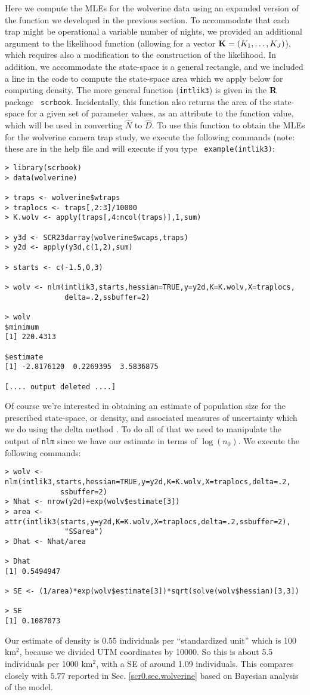Here we compute the MLEs for the wolverine data using an expanded
version of the function we developed in the previous section. To
accommodate that each trap might be operational a variable number of
nights, we provided an additional argument to the likelihood function
(allowing for a vector ${\bf K}= (K_{1},\ldots,K_{J})$), which
requires also a modification to the construction of the likelihood.
In addition, we accommodate the state-space is a general rectangle,
and we included a line in the code to compute the state-space area
which we apply below for computing density.  The more general function
(\mbox{\tt intlik3}) is given in the {\bf R} package \mbox{\tt
  scrbook}.  Incidentally, this function also returns the area of the
state-space for a given set of parameter values, as an attribute to
the function value, which will be used in converting $\hat{N}$ to
$\hat{D}$.  To use this function to obtain the MLEs for the wolverine
camera trap study, we execute the following commands (note: these are
in the help file and will execute if you type \mbox{\tt
  example(intlik3)}: 
{\small
\begin{verbatim}
> library(scrbook)
> data(wolverine)
 
> traps <- wolverine$wtraps
> traplocs <- traps[,2:3]/10000
> K.wolv <- apply(traps[,4:ncol(traps)],1,sum)

> y3d <- SCR23darray(wolverine$wcaps,traps)
> y2d <- apply(y3d,c(1,2),sum)

> starts <- c(-1.5,0,3)

> wolv <- nlm(intlik3,starts,hessian=TRUE,y=y2d,K=K.wolv,X=traplocs,
              delta=.2,ssbuffer=2)

> wolv
$minimum
[1] 220.4313

$estimate
[1] -2.8176120  0.2269395  3.5836875

[.... output deleted ....]
\end{verbatim}
} Of course we're interested in obtaining an estimate of population
size for the prescribed state-space, or density, and associated
measures of uncertainty which we do using the delta method
\citep[][Appendix F4]{williams_etal:2002}.  To do all of that we need
to manipulate the output of \mbox{\tt nlm} since we have our estimate
in terms of $\log(n_{0})$. We execute the following commands: 
{\small
\begin{verbatim}
> wolv <- nlm(intlik3,starts,hessian=TRUE,y=y2d,K=K.wolv,X=traplocs,delta=.2,
             ssbuffer=2)
> Nhat <- nrow(y2d)+exp(wolv$estimate[3])
> area <- attr(intlik3(starts,y=y2d,K=K.wolv,X=traplocs,delta=.2,ssbuffer=2), 
              "SSarea")
> Dhat <- Nhat/area

> Dhat
[1] 0.5494947

> SE <- (1/area)*exp(wolv$estimate[3])*sqrt(solve(wolv$hessian)[3,3])

> SE
[1] 0.1087073
\end{verbatim}
} 
{\flushleft Our} estimate of density is $0.55$ individuals per ``standardized
unit'' which is 100 km$^2$, because we divided UTM coordinates by
10000.  So this is about 5.5 individuals per 1000 km$^2$,
with a SE of around 1.09
individuals.  This compares closely with $5.77$
reported in
Sec. \ref{scr0.sec.wolverine} based on Bayesian
analysis of the model.


